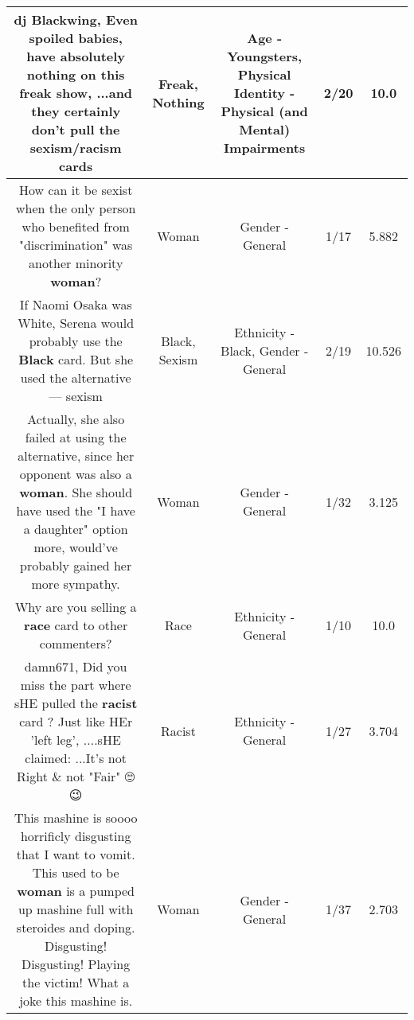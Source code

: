 \documentclass[11pt]{article}
\newlength\mylength
\begin{document}
\begin{center}
\begin{longtable}{|C{.65\mylength}|C{.30\mylength}|C{.12\mylength}|C{.12\mylength}|C{.12\mylength}|}
  \small dj Blackwing, Even spoiled babies, have absolutely \textbf{nothing} on this \textbf{freak} show, ...and they certainly don't pull the sexism/racism cards\normalsize   & Freak, Nothing & Age - Youngsters, Physical Identity - Physical (and Mental) Impairments & 2/20 & 10.0 \\  \hline
  \small How can it be sexist when the only person who benefited from "discrimination" was another minority \textbf{woman}?\normalsize   & Woman & Gender - General & 1/17 & 5.882 \\  \hline
  \small If Naomi Osaka was White, Serena would probably use the \textbf{Black} card. But she used the alternative — sexism\normalsize   & Black, Sexism & Ethnicity - Black, Gender - General & 2/19 & 10.526 \\  \hline
  \small Actually, she also failed at using the alternative, since her opponent was also a \textbf{woman}. She should have used the "I have a daughter" option more, would've probably gained her more sympathy.\normalsize   & Woman & Gender - General & 1/32 & 3.125 \\  \hline
  \small Why are you selling a \textbf{race} card to other commenters?\normalsize   & Race & Ethnicity - General & 1/10 & 10.0 \\  \hline
  \small damn671, Did you miss the part where sHE pulled the \textbf{racist} card ? Just like HEr 'left leg', ....sHE claimed:  ...It's not Right \& not "Fair" 🙄😉\normalsize   & Racist & Ethnicity - General & 1/27 & 3.704 \\  \hline
  \small This mashine is soooo horrificly disgusting that I want to vomit. This used to be \textbf{woman} is a pumped up mashine full with steroides and doping. Disgusting! Disgusting! Playing the victim! What a joke this mashine is.\normalsize   & Woman & Gender - General & 1/37 & 2.703 \\  \hline

\end{longtable}
\end{center}
\end{document}

